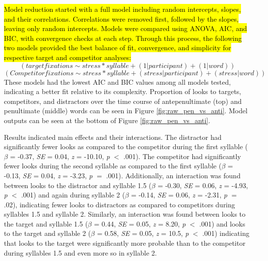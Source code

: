 \hl{Model reduction started with a full model including random intercepts, slopes, and their correlations. Correlations were removed first, followed by the slopes, leaving only random intercepts. Models were compared using ANOVA, AIC, and BIC, with convergence checks at each step. Through this process, the following two models provided the best balance of fit, convergence, and simplicity for respective target and competitor analyses:} $$(target fixations \sim stress * syllable + (1|participant)+(1|word))$$
$$(Competitor fixations \sim stress * syllable + (stress|participant)+(stress|word))$$
These models had the lowest AIC and BIC values among all models tested, indicating a better fit relative to its complexity. Proportion of looks to targets, competitors, and distractors over the time course of antepenultimate (top) and  penultimate (middle) words can be seen in Figure \ref{fig:raw_pen_vs_anti}. Model outputs can be seen at the bottom of Figure \ref{fig:raw_pen_vs_anti}.

Results indicated main effects and their interactions. The distractor had significantly fewer looks as compared to the competitor during the first syllable ($\beta$ = -0.37, \textit{SE} = 0.04, \textit{z} = -10.10, \textit{p} $<$ .001). The competitor had significantly fewer looks during the second syllable as compared to the first syllable  ($\beta$ = -0.13, \textit{SE} = 0.04, \textit{z} = -3.23, \textit{p} $=$ .001). Additionally, an interaction was found between looks to the distractor and syllable 1.5 ($\beta$ = -0.30, \textit{SE} = 0.06, \textit{z} = -4.93, \textit{p} $<$ .001) and again during syllable 2 ($\beta$ = -0.14, \textit{SE} = 0.06, \textit{z} = -2.31, \textit{p} $=$ .02), indicating fewer looks to distractors as compared to competitors during syllables 1.5 and syllable 2. Similarly, an interaction was found between looks to the target and syllable 1.5 ($\beta$ = 0.44, \textit{SE} = 0.05, \textit{z} = 8.20, \textit{p} $<$ .001) and looks to the target and syllable 2 ($\beta$ = 0.58, \textit{SE} = 0.05, \textit{z} = 10.5, \textit{p} $<$ .001) indicating that looks to the target were significantly more probable than to the competitor during syllables 1.5 and even more so in syllable 2.  

